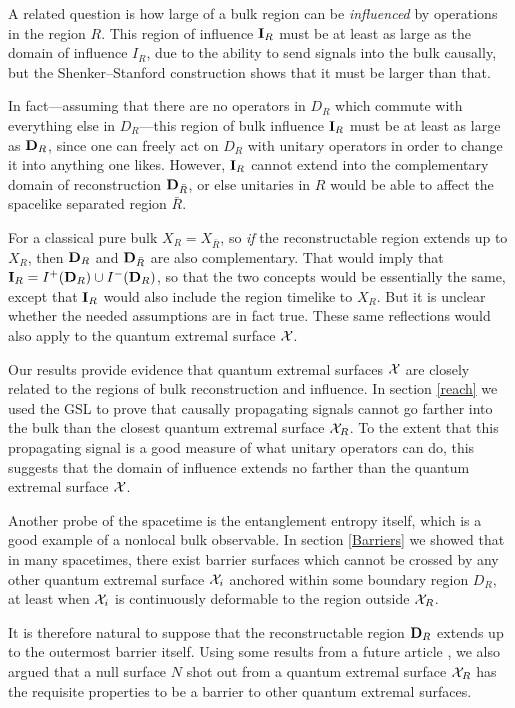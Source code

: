 \documentclass[12pt]{article}
\theoremstyle{remark}
\numberwithin{equation}{section}
\numberwithin{equation}{section}
\begin{document}
A related question is how large of a bulk region can be \emph{influenced} by operations in the region $R$.  This region of influence ${\bf I}_R$ must be at least as large as the domain of influence $I_R$, due to the ability to send signals into the bulk causally, but the Shenker--Stanford construction \cite{ShenkerStanford} shows that it must be larger than that.  

In fact---assuming that there are no operators in $D_R$ which commute with everything else in $D_R$---this region of bulk influence ${\bf I}_R$ must be at least as large as ${\bf D}_R$, since one can freely act on $D_R$ with unitary operators in order to change it into anything one likes.  However, ${\bf I}_R$ cannot extend into the complementary domain of reconstruction 
${\bf D}_{\bar{R}}$, or else unitaries in $R$ would be able to affect the spacelike separated region $\bar{R}$.  

For a classical pure bulk $X_R = X_{\bar{R}}$, so \emph{if} the reconstructable region extends up to $X_R$, then ${\bf D}_R$ and ${\bf D}_{\bar{R}}$ are also complementary.  That would imply that ${\bf I}_R = I^+({\bf D}_R) \cup I^-({\bf D}_R)$, so that the two concepts would be essentially the same, except that ${\bf I}_R$ would also include the region timelike to $X_R$.  But it is unclear whether the needed assumptions are in fact true.  These same reflections would also apply to the quantum extremal surface ${\cal X}$.

Our results provide evidence that quantum extremal surfaces ${\cal X}$ are closely related to the regions of bulk reconstruction and influence.  In section \ref{reach} we used the GSL to prove that causally propagating signals cannot go farther into the bulk than the closest quantum extremal surface ${\cal X}_R$.  To the extent that this propagating signal is a good measure of what unitary operators can do, this suggests that the domain of influence extends no farther than the quantum extremal surface ${\cal X}$.

Another probe of the spacetime is the entanglement entropy itself, which is a good example of a nonlocal bulk observable.  In section \ref{Barriers} we showed that in many spacetimes, there exist barrier surfaces which cannot be crossed by any other quantum extremal surface ${\cal X}_i$ anchored within some boundary region $D_R$, at least when ${\cal X}_i$ is continuously deformable to the region outside ${\cal X}_R$.

It is therefore natural to suppose that the reconstructable region ${\bf D}_R$ extends up to the outermost barrier itself.  Using some results from a future article \cite{EntropicFocusing}, we also argued that a null surface $N$ shot out from a quantum extremal surface ${\cal X}_R$ has the requisite properties to be a barrier to other quantum extremal surfaces.
 
\end{document}
